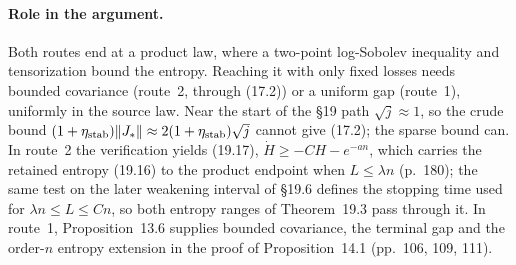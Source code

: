 \documentclass[11pt]{article}
\newcommand{\norm}[1]{\lVert #1\rVert}
\newcommand{\ploc}[2]{#1}
\begin{document}
\paragraph{Role in the argument.}
Both routes end at a product law, where a two-point log-Sobolev inequality
and tensorization bound the entropy. Reaching it with only fixed losses needs
bounded covariance (route~2, through (17.2)) or a uniform gap (route~1),
uniformly in the source law. Near the start of the \S19 path
$\sqrt j\approx1$, so the crude bound
$(1+\eta_{\rm stab})\norm{J_*}\approx2(1+\eta_{\rm stab})\sqrt j$ cannot
give (17.2); the sparse bound can. In route~2 the verification yields
\ploc{(19.17)}{cap:constant-entropy-ode}, $\dot H\ge-CH-e^{-an}$, which
carries the retained entropy \ploc{(19.16)}{cap:retained-entropy} to the
product endpoint when $L\le\lambda n$
\ploc{(p.~180)}{cap-entropy.tex:649--652}; the same test on the later
weakening interval of \ploc{\S19.6}{cap-entropy.tex:751--754, 777--786,
806--809} defines the stopping time used for $\lambda n\le L\le Cn$, so both
entropy ranges of
\ploc{Theorem~19.3}{cap-entropy.tex:856--874} pass through it. In route~1,
Proposition~13.6 supplies bounded covariance, the terminal gap and the
order-$n$ entropy extension in the proof of Proposition~14.1
\ploc{(pp.~106, 109, 111)}{profile-entropy.tex:190--195, 427--429, 575--579}.
\end{document}
